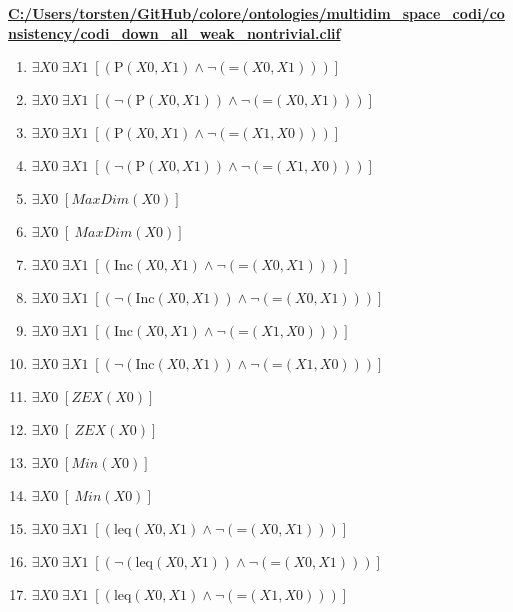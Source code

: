 \documentclass{article}
\begin{document}
\textbf{\url{C:/Users/torsten/GitHub/colore/ontologies/multidim\_space\_codi/consistency/codi\_down\_all\_weak\_nontrivial.clif}}

\begin{enumerate}
\item $\exists X0\; \exists X1\;  \left[ \left(\textrm{P}(X0,X1) \land \neg \left(\textrm{=}(X0,X1)\right)\right) \right]$
\item $\exists X0\; \exists X1\;  \left[ \left(\neg \left(\textrm{P}(X0,X1)\right) \land \neg \left(\textrm{=}(X0,X1)\right)\right) \right]$
\item $\exists X0\; \exists X1\;  \left[ \left(\textrm{P}(X0,X1) \land \neg \left(\textrm{=}(X1,X0)\right)\right) \right]$
\item $\exists X0\; \exists X1\;  \left[ \left(\neg \left(\textrm{P}(X0,X1)\right) \land \neg \left(\textrm{=}(X1,X0)\right)\right) \right]$
\item $\exists X0\;  \left[ MaxDim(X0) \right]$
\item $\exists X0\;  \left[ ~MaxDim(X0) \right]$
\item $\exists X0\; \exists X1\;  \left[ \left(\textrm{Inc}(X0,X1) \land \neg \left(\textrm{=}(X0,X1)\right)\right) \right]$
\item $\exists X0\; \exists X1\;  \left[ \left(\neg \left(\textrm{Inc}(X0,X1)\right) \land \neg \left(\textrm{=}(X0,X1)\right)\right) \right]$
\item $\exists X0\; \exists X1\;  \left[ \left(\textrm{Inc}(X0,X1) \land \neg \left(\textrm{=}(X1,X0)\right)\right) \right]$
\item $\exists X0\; \exists X1\;  \left[ \left(\neg \left(\textrm{Inc}(X0,X1)\right) \land \neg \left(\textrm{=}(X1,X0)\right)\right) \right]$
\item $\exists X0\;  \left[ ZEX(X0) \right]$
\item $\exists X0\;  \left[ ~ZEX(X0) \right]$
\item $\exists X0\;  \left[ Min(X0) \right]$
\item $\exists X0\;  \left[ ~Min(X0) \right]$
\item $\exists X0\; \exists X1\;  \left[ \left(\textrm{leq}(X0,X1) \land \neg \left(\textrm{=}(X0,X1)\right)\right) \right]$
\item $\exists X0\; \exists X1\;  \left[ \left(\neg \left(\textrm{leq}(X0,X1)\right) \land \neg \left(\textrm{=}(X0,X1)\right)\right) \right]$
\item $\exists X0\; \exists X1\;  \left[ \left(\textrm{leq}(X0,X1) \land \neg \left(\textrm{=}(X1,X0)\right)\right) \right]$

\end{enumerate}
\end{document}
